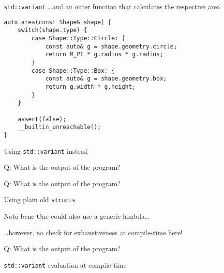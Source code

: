 \begin{frame}[fragile]{\texttt{std::variant}}
    \ldots and an outer function that calculates the respective area
    \begin{lstlisting}
auto area(const Shape& shape) {
    switch(shape.type) {
        case Shape::Type::Circle: {
            const auto& g = shape.geometry.circle;
            return M_PI * g.radius * g.radius;
        }
        case Shape::Type::Box: {
            const auto& g = shape.geometry.box;
            return g.width * g.height;
        }
    }

    assert(false);
    __builtin_unreachable();
}
    \end{lstlisting}
\end{frame}

\begin{frame}
\end{frame}

\begin{frame}[fragile]{Using \texttt{std::variant} instead}
\end{frame}

\begin{frame}
    \centering
    \scalebox{8.}{\}}
\end{frame}

\begin{frame}[fragile]{Q: What is the output of the program?}
\end{frame}


\begin{frame}[fragile]{Q: What is the output of the program?}
\end{frame}


\begin{frame}[fragile]{Using plain old \texttt{structs}}
\end{frame}

\begin{frame}{Nota bene}
    One could also use a generic lambda\ldots

    \hfill \ldots however, no check for exhaustiveness at compile-time here!
\end{frame}

\begin{frame}{Q: What is the output of the program?}
\end{frame}


\begin{frame}[fragile]{\texttt{std::variant} evaluation at compile-time}
\end{frame}
